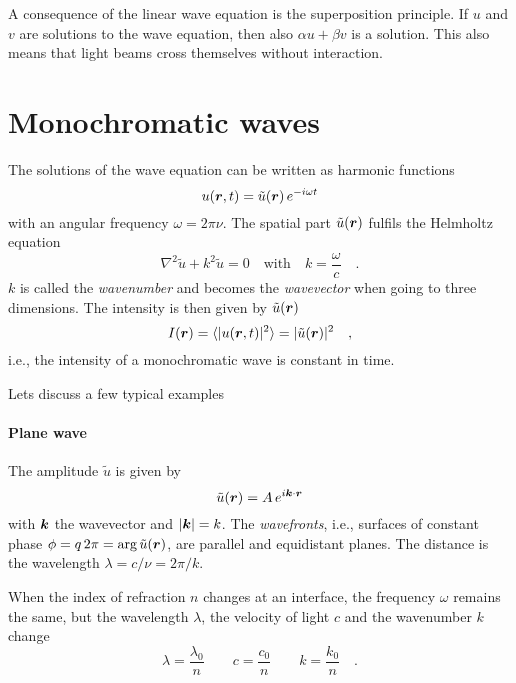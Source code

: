 A consequence of the linear wave equation is the superposition principle. If $u$ and $v$ are solutions to the wave equation, then also $\alpha u + \beta v$ is a solution. This also means that light beams cross themselves without interaction.


\section{Monochromatic waves}

The solutions of the wave equation can be written as harmonic functions
\begin{equation}
    u(\boldsymbol{r}, t)  = \tilde{u}(\boldsymbol{r}) \, e^{- i \omega t}
\end{equation}
with an angular frequency $\omega = 2 \pi \nu$. The spatial part $\tilde{u}(\boldsymbol{r})$ fulfils the Helmholtz equation
\begin{equation}
    \nabla^2 \tilde{u} + k^2 \tilde{u} = 0 \quad \text{with} \quad k = \frac{\omega}{c} \quad .
\end{equation}
$k$ is called the \emph{wavenumber} and becomes the \emph{wavevector} when going to three dimensions. The intensity is then given by $\tilde{u}(\boldsymbol{r})$
\begin{equation}
    I(\boldsymbol{r}) = \braket{ |u(\boldsymbol{r}, t) |^2 } = |\tilde{u}(\boldsymbol{r}) |^2 \quad , 
\end{equation}
i.e., the intensity of a monochromatic wave is constant in time. 

Lets discuss a few typical examples

\paragraph*{Plane wave} The amplitude $\tilde{u}$ is given by
\begin{equation}
 \tilde{u}(\boldsymbol{r}) = A \, e^{i \boldsymbol{k} \cdot \boldsymbol{r}}
\end{equation}
with $\boldsymbol{k}$ the wavevector and $|\boldsymbol{k}| = k $. The \emph{wavefronts}, i.e., surfaces of constant phase $\phi = q \, 2 \pi =  \arg \tilde{u}(\boldsymbol{r})$, are parallel and equidistant planes. The distance is the wavelength $\lambda = c / \nu = 2 \pi / k$.

When the index of refraction $n$ changes at an interface, the frequency $\omega$ remains the same, but the wavelength $\lambda$, the velocity of light $c$ and the wavenumber $k$ change
\begin{equation}
\lambda = \frac{\lambda_0}{n} \qquad
c = \frac{c_0}{n} \qquad
k = \frac{k_0}{n} \quad .
\end{equation}
 

